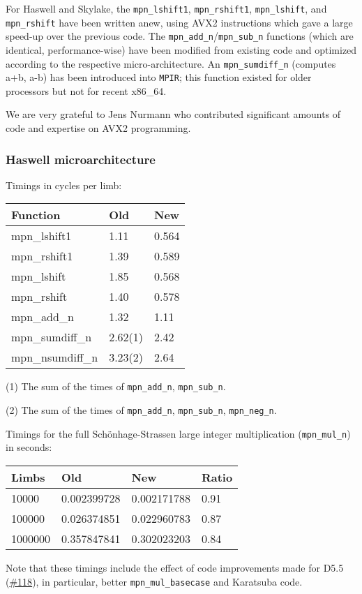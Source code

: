 For Haswell and Skylake, the \texttt{mpn\_lshift1},
\texttt{mpn\_rshift1}, \texttt{mpn\_lshift}, and \texttt{mpn\_rshift}
have been written anew, using AVX2 instructions which gave a large
speed-up over the previous code. The
\texttt{mpn\_add\_n}/\texttt{mpn\_sub\_n} functions (which are
identical, performance-wise) have been modified from existing code and
optimized according to the respective micro-architecture. An
\texttt{mpn\_sumdiff\_n} (computes a+b, a-b) has been introduced into
\texttt{MPIR}; this function existed for older processors but not for
recent x86\_64.

We are very grateful to Jens Nurmann who contributed significant amounts
of code and expertise on AVX2 programming.

\subsubsection{Haswell
microarchitecture}\label{haswell-microarchitecture}

Timings in cycles per limb:

\begin{longtable}[c]{@{}lll@{}}
\toprule
Function & Old & New\tabularnewline
\midrule
\endhead
mpn\_lshift1 & 1.11 & 0.564\tabularnewline
mpn\_rshift1 & 1.39 & 0.589\tabularnewline
mpn\_lshift & 1.85 & 0.568\tabularnewline
mpn\_rshift & 1.40 & 0.578\tabularnewline
mpn\_add\_n & 1.32 & 1.11\tabularnewline
mpn\_sumdiff\_n & 2.62(1) & 2.42\tabularnewline
mpn\_nsumdiff\_n & 3.23(2) & 2.64\tabularnewline
\bottomrule
\end{longtable}

(1) The sum of the times of \texttt{mpn\_add\_n}, \texttt{mpn\_sub\_n}.

(2) The sum of the times of \texttt{mpn\_add\_n}, \texttt{mpn\_sub\_n},
\texttt{mpn\_neg\_n}.

Timings for the full Schönhage-Strassen large integer multiplication
(\texttt{mpn\_mul\_n}) in seconds:

\begin{longtable}[c]{@{}llll@{}}
\toprule
Limbs & Old & New & Ratio\tabularnewline
\midrule
\endhead
10000 & 0.002399728 & 0.002171788 & 0.91\tabularnewline
100000 & 0.026374851 & 0.022960783 & 0.87\tabularnewline
1000000 & 0.357847841 & 0.302023203 & 0.84\tabularnewline
\bottomrule
\end{longtable}

Note that these timings include the effect of code improvements made for
D5.5
(\href{https://github.com/OpenDreamKit/OpenDreamKit/issues/118}{\#118}),
in particular, better \texttt{mpn\_mul\_basecase} and Karatsuba code.

